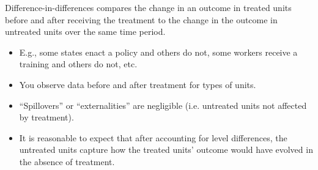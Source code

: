 \documentclass[10pt,a4paper]{protocol}
\begin{document}







\begin{fullwidth}
\makeheader
\end{fullwidth}

Difference-in-differences compares the change in an outcome in treated units before and after receiving the treatment to the change in the outcome in untreated units over the same time period.


\begin{itemize}
	\item E.g., some states enact a policy and others do not, some workers receive a training and others do not, etc.
	\item You observe data before and after treatment for types of units.
	\item ``Spillovers'' or ``externalities'' are negligible (i.e. untreated units not affected by treatment).
\end{itemize}
\divider

\begin{itemize}
	\item It is reasonable to expect that after accounting for level differences, the untreated units capture how the treated units' outcome would have evolved in the absence of treatment.
\end{itemize}
\divider

\end{document}
